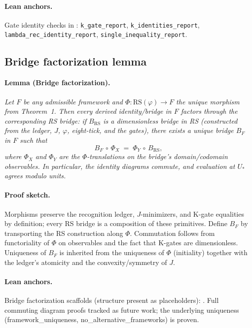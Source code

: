 \documentclass[11pt]{article}
\begin{document}
\paragraph{Lean anchors.} Gate identity checks in : \texttt{k\_gate\_report}, \texttt{k\_identities\_report}, \texttt{lambda\_rec\_identity\_report}, \texttt{single\_inequality\_report}.

\subsection{Bridge factorization lemma}
\paragraph{Lemma (Bridge factorization).} \emph{Let \(F\) be any admissible framework and \(\Phi\colon \mathrm{RS}(\varphi)\to F\) the unique morphism from Theorem~1. Then every derived identity/bridge in \(F\) factors through the corresponding RS bridge: if \(B_{\mathrm{RS}}\) is a dimensionless bridge in RS (constructed from the ledger, \(J\), \(\varphi\), eight\mbox{-}tick, and the gates), there exists a unique bridge \(B_F\) in \(F\) such that}
\[
  B_F\,\circ\, \Phi_X \;=\; \Phi_Y\,\circ\, B_{\mathrm{RS}},
\]
\emph{where \(\Phi_X\) and \(\Phi_Y\) are the \(\Phi\)\mbox{-}translations on the bridge's domain/codomain observables. In particular, the identity diagrams commute, and evaluation at \(U_*\) agrees modulo units.}

\paragraph{Proof sketch.} Morphisms preserve the recognition ledger, \(J\)\mbox{-}minimizers, and K\mbox{-}gate equalities by definition; every RS bridge is a composition of these primitives. Define \(B_F\) by transporting the RS construction along \(\Phi\). Commutation follows from functoriality of \(\Phi\) on observables and the fact that K\mbox{-}gates are dimensionless. Uniqueness of \(B_F\) is inherited from the uniqueness of \(\Phi\) (initiality) together with the ledger's atomicity and the convexity/symmetry of \(J\).

\paragraph{Lean anchors.} Bridge factorization scaffolds (structure present as placeholders): . Full commuting diagram proofs tracked as future work; the underlying uniqueness (framework\_uniqueness, no\_alternative\_frameworks) is proven.
\end{document}
